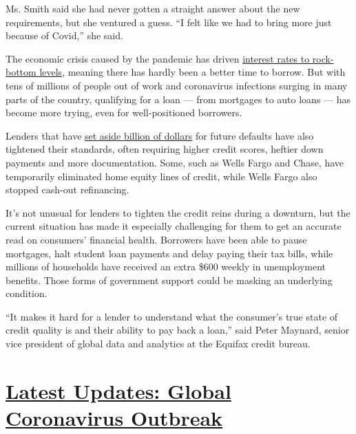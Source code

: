 Ms. Smith said she had never gotten a straight answer about the new
requirements, but she ventured a guess. ``I felt like we had to bring
more just because of Covid,'' she said.

The economic crisis caused by the pandemic has driven
\href{https://www.nytimes3xbfgragh.onion/2020/07/16/business/mortgage-rates-below-3-percent.html}{interest
rates to rock-bottom levels}, meaning there has hardly been a better
time to borrow. But with tens of millions of people out of work and
coronavirus infections surging in many parts of the country, qualifying
for a loan --- from mortgages to auto loans --- has become more trying,
even for well-positioned borrowers.

Lenders that have
\href{https://www.nytimes3xbfgragh.onion/2020/07/14/business/big-banks-quarterly-results.html}{set
aside billion of dollars} for future defaults have also tightened their
standards, often requiring higher credit scores, heftier down payments
and more documentation. Some, such as Wells Fargo and Chase, have
temporarily eliminated home equity lines of credit, while Wells Fargo
also stopped cash-out refinancing.

It's not unusual for lenders to tighten the credit reins during a
downturn, but the current situation has made it especially challenging
for them to get an accurate read on consumers' financial health.
Borrowers have been able to pause mortgages, halt student loan payments
and delay paying their tax bills, while millions of households have
received an extra \$600 weekly in unemployment benefits. Those forms of
government support could be masking an underlying condition.

``It makes it hard for a lender to understand what the consumer's true
state of credit quality is and their ability to pay back a loan,'' said
Peter Maynard, senior vice president of global data and analytics at the
Equifax credit bureau.

\hypertarget{latest-updates-global-coronavirus-outbreak}{%
\section{\texorpdfstring{\href{https://www.nytimes3xbfgragh.onion/2020/08/04/world/coronavirus-cases.html?action=click\&pgtype=Article\&state=default\&region=MAIN_CONTENT_1\&context=storylines_live_updates}{Latest
Updates: Global Coronavirus
Outbreak}}{Latest Updates: Global Coronavirus Outbreak}}\label{latest-updates-global-coronavirus-outbreak}}

